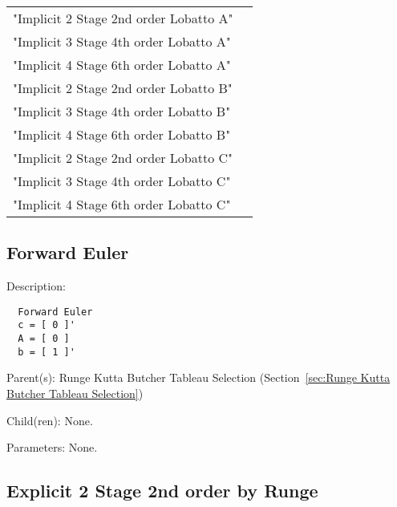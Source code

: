 \begin{list}{}
\begin{description}
\begin{tabular}{lp{}}
      "Implicit 2 Stage 2nd order Lobatto A" & \\ 
      "Implicit 3 Stage 4th order Lobatto A" & \\ 
      "Implicit 4 Stage 6th order Lobatto A" & \\ 
      "Implicit 2 Stage 2nd order Lobatto B" & \\ 
      "Implicit 3 Stage 4th order Lobatto B" & \\ 
      "Implicit 4 Stage 6th order Lobatto B" & \\ 
      "Implicit 2 Stage 2nd order Lobatto C" & \\ 
      "Implicit 3 Stage 4th order Lobatto C" & \\ 
      "Implicit 4 Stage 6th order Lobatto C" & \\ 
      \end{tabular}
\end{description}

\end{list}

\subsection{Forward Euler}
\label{sec:Forward Euler-Runge Kutta Butcher Tableau Selection}

\begin{list}{}
  {\setlength{\leftmargin}{1.0in}
   \setlength{\labelwidth}{0.75in}
   \setlength{\labelsep}{0.125in}}
  \item[Description:]
\begin{verbatim}
  Forward Euler
  c = [ 0 ]'
  A = [ 0 ]
  b = [ 1 ]'
\end{verbatim}
  \item[Parent(s):]
    Runge Kutta Butcher Tableau Selection (Section~\ref{sec:Runge Kutta Butcher Tableau Selection})
  \item[Child(ren):]
    None. 
  \item[Parameters:]
    None. 
\end{list}

\subsection{Explicit 2 Stage 2nd order by Runge}
\label{sec:Explicit 2 Stage 2nd order by Runge}

